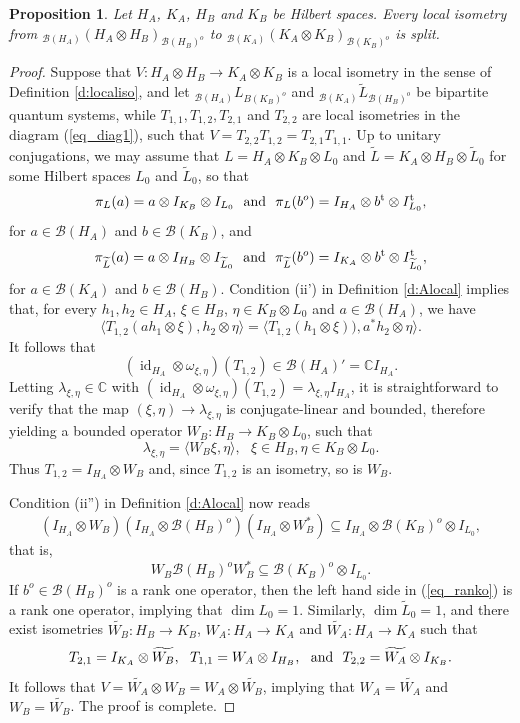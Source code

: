\documentclass[11pt]{amsart}
\newtheorem{proposition}[theorem]{Proposition}
\theoremstyle{definition}
\DeclareMathOperator{\id}{id}
\newcommand{\cl}[1]{\mathcal{#1}}
\newcommand{\bb}[1]{\mathbb{#1}}
\newcommand{\ten}{\otimes}
\providecommand{\wt}[1]{\widetilde{#1}}
\begin{document}
\begin{proposition}\label{p_split}
Let $H_A$, $K_A$, $H_B$ and $K_B$ be Hilbert spaces.
Every local isometry from $_{\cl B(H_A)}(H_A\otimes H_B)_{\cl B(H_B)^{o}}$ to $_{\cl B(K_A)}(K_A\otimes K_B)_{\cl B(K_B)^{o}}$
is split. 
\end{proposition}

\begin{proof}
Suppose that 
$V : H_A\ten H_B\to K_A\ten K_B$ is a local isometry in the sense of Definition \ref{d:localiso}, and let 
$_{\cl B(H_A)}L_{B(K_B)^{o}}$ and $_{\cl B(K_A)}\wt{L}_{\cl B(H_B)^{o}}$
be bipartite quantum systems, while 
$T_{1,1}, T_{1,2}, T_{2,1}$ and $T_{2,2}$ are local isometries
in the diagram (\ref{eq_diag1}), 
such that $V = T_{2,2}T_{1,2} = T_{2,1}T_{1,1}$.
Up to unitary conjugations, we may assume that 
$L = H_A\ten K_B\ten L_0$ and $\wt{L} = K_A\ten H_B\ten\wt{L}_0$ 
for some Hilbert spaces $L_0$ and $\wt{L}_0$, 
so that 
$$\pi_L(a) = a\ten I_{K_B}\ten I_{L_0} \ \mbox{ and } \ 
\pi_L(b^o) = I_{H_A} \ten b^{\rm t} \ten I_{L_0}^{\rm t},$$
for $a\in \cl B(H_A)$ and $b\in \cl B(K_B)$, 
and 
$$\pi_{\wt{L}}(a) = a\ten I_{H_B}\ten I_{\wt{L}_0} \ \mbox{ and } \ 
\pi_{\wt{L}}(b^o) = I_{K_A} \ten b^{\rm t} \ten I_{\wt{L}_0}^{\rm t},$$
for $a\in \cl B(K_A)$ and $b\in \cl B(H_B)$.
Condition (ii') in Definition \ref{d:Alocal} implies that, for every
$h_1,h_2\in H_A$, $\xi\in H_B$, $\eta\in K_B\ten L_0$ and 
$a\in \cl B(H_A)$, we have 
$$\langle T_{1,2}(ah_1\otimes\xi), h_2\otimes\eta\rangle = 
\langle T_{1,2}(h_1\otimes\xi)), a^*h_2\otimes\eta\rangle.
$$
It follows that 
$$(\id_{H_A}\ten\omega_{\xi,\eta})(T_{1,2}) \in \cl B(H_A)' = \bb{C} I_{H_A}.$$ 
Letting $\lambda_{\xi,\eta}\in \bb{C}$ with 
$(\id_{H_A}\ten\omega_{\xi,\eta})(T_{1,2}) = \lambda_{\xi,\eta} I_{H_A}$, 
it is straightforward to verify that the map
$(\xi,\eta)\to \lambda_{\xi,\eta}$ is conjugate-linear and 
bounded, therefore yielding a bounded operator 
$W_B : H_B\to K_B\ten L_0$, such that 
$$\lambda_{\xi,\eta} = \langle W_B\xi,\eta\rangle, 
\ \ \ \xi\in H_B, \eta\in K_B\ten L_0.$$
Thus $T_{1,2} = I_{H_A}\ten W_B$ and, since $T_{1,2}$ is an 
isometry, so is $W_B$. 

Condition (ii'') in Definition \ref{d:Alocal} now reads
$$(I_{H_A}\ten W_B)(I_{H_A}\otimes \cl B(H_B)^o) (I_{H_A}\ten W_B^*) 
\subseteq I_{H_A}\otimes \cl B(K_B)^o\otimes I_{L_0},$$
that is, 
\begin{equation}\label{eq_ranko}
W_B \cl B(H_B)^o W_B^*\subseteq \cl B(K_B)^o\otimes I_{L_0}.
\end{equation}
If $b^o\in \cl B(H_B)^o$ is a rank one operator, then 
the left hand side in (\ref{eq_ranko}) is a rank one operator, 
implying that $\dim L_0 = 1$. 
Similarly, $\dim \wt{L}_0 = 1$, and there exist 
isometries $\wt{W_B} : H_B \to K_B$, 
$W_A : H_A\to K_A$ and 
$\wt{W_A} : H_A\to K_A$ such that 
$$T_{2,1} = I_{K_A}\ten \wt{W_B}, \ \ T_{1,1} = W_A\ten I_{H_B}, \ \ \textnormal{and} \ \ T_{2,2} = \wt{W_A}\ten I_{K_B}.$$
It follows that 
$V = \wt{W_A}\ten W_B = W_A\ten \wt{W_B}$, implying 
that $W_A = \wt{W_A}$ and $W_B = \wt{W_B}$.
The proof is complete. 
\end{proof}
\end{document}
